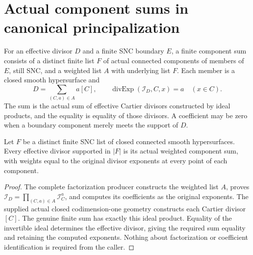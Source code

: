 \section{Actual component sums in canonical principalization}

\begin{definition}
\label{hir:finite-connected-component-sum-contract}
\leanok
For an effective divisor $D$ and a finite SNC boundary $E$, a finite component
sum consists of a distinct finite list $F$ of actual connected components of
members of $E$, still SNC, and a weighted list $A$ with underlying list $F$.
Each member is a closed smooth hypersurface and
\[
 D=\sum_{(C,a)\in A}a[C],\qquad
 \operatorname{divExp}(\mathcal I_D,C,x)=a\quad(x\in C).
\]
The sum is the actual sum of effective Cartier divisors constructed by
ideal products, and the equality is equality of those divisors. A coefficient
may be zero when a boundary component merely meets the support of $D$.
\end{definition}

\begin{theorem}
\label{hir:complete-finite-connected-divisor-sum}
\leanok
Let $F$ be a distinct finite SNC list of closed connected smooth
hypersurfaces. Every effective divisor supported in $|F|$ is its actual
weighted component sum, with weights equal to the original divisor exponents
at every point of each component.
\end{theorem}
\begin{proof}
The complete factorization producer constructs the weighted list $A$, proves
$\mathcal I_D=\prod_{(C,a)\in A}\mathcal I_C^a$, and computes its coefficients
as the original exponents. The supplied actual closed codimension-one
geometry constructs each Cartier divisor $[C]$. The genuine finite sum has
exactly this ideal product. Equality of the invertible ideal determines the
effective divisor, giving the required sum equality and retaining the
computed exponents. Nothing about factorization or coefficient identification
is required from the caller.
\end{proof}

